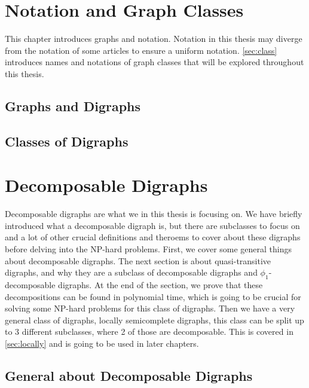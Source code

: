 
\chapter{Notation and Graph Classes}
This chapter introduces graphs and notation. 
Notation in this thesis may diverge from the notation of some articles to ensure a uniform notation.  \autoref{sec:class} introduces names and notations of graph classes that will be explored throughout this thesis.
\label{chap:intro}
\section{Graphs and Digraphs}
\label{sec:digraph}

%
\section{Classes of Digraphs}
\label{sec:class}


\chapter{Decomposable Digraphs}
\label{chap:decomposable}
Decomposable digraphs are what we in this thesis is focusing on. 
We have briefly introduced what a decomposable digraph is, but there are subclasses to focus on and a lot of other crucial definitions and theroems to cover about these digraphs before delving into the NP-hard problems. 
First, we cover some general things about decomposable digraphs. 
The next section is about quasi-transitive digraphs, and why they are a subclass of decomposable digraphs and $\phi_1$-decomposable digraphs. 
At the end of the section, we prove that these decompositions can be found in polynomial time, which is going to be crucial for solving some NP-hard problems for this class of digraphs. 
Then we have a very general class of digraphs, locally semicomplete digraphs, this class can be split up to 3 different subclasses, where 2 of those are decomposable. 
This is covered in \autoref{sec:locally} and is going to be used in later chapters. 
\section{General about Decomposable Digraphs}
\label{sec:gdecomposable}

